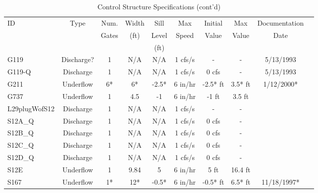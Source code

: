 \scriptsize
\begin{table}[h]
\caption{Control Structure Specifications (cont'd)}
\label{tab:struc-specs2}
\begin{tabular}{@{}lccccccccc@{}}
\toprule
{ID}            & {Type}        & Num.     & Width       & Sill         & Max            & Initial         & Max     & Documentation   \\
                &               & Gates    & (ft)        & Level        & Speed          & Value           & Value   & Date            \\
                &               &          &             & (ft)         &                &                 &         &                 \\
\hline
{G119}          & Discharge?    & 1        & N/A         & N/A          & 1 cfs/s        & -               & -       & 5/13/1993       \\
{G119-Q}        & Discharge     & 1        & N/A         & N/A          & 1 cfs/s        & 0 cfs           & -       & 5/13/1993       \\
{G211}          & Underflow     & 6*       & 6*          & -2.5*        & 6 in/hr        & -2.5* ft        & 3.5* ft & 1/12/2000*      \\
{G737}          & Underflow     & 1        & 4.5         & -1           & 6 in/hr        & -1 ft           & 3.5 ft  &                 \\
{L29plugWofS12} & Discharge     & 1        & N/A         & N/A          & 1 cfs/s        & -               & -       &                 \\
{S12A\_Q}       & Discharge     & 1        & N/A         & N/A          & 1 cfs/s        & 0 cfs           & -       &                 \\
{S12B\_Q}       & Discharge     & 1        & N/A         & N/A          & 1 cfs/s        & 0 cfs           & -       &                 \\
{S12C\_Q}       & Discharge     & 1        & N/A         & N/A          & 1 cfs/s        & 0 cfs           & -       &                 \\
{S12D\_Q}       & Discharge     & 1        & N/A         & N/A          & 1 cfs/s        & 0 cfs           & -       &                 \\
{S12E}          & Underflow     & 1        & 9.84        & 5            & 6 in/hr        & 5 ft            & 16.4 ft &                 \\
{S167}          & Underflow     & 1*       & 12*         & -0.5*        & 6 in/hr        & -0.5* ft        & 6.5* ft & 11/18/1997*     \\

\end{tabular}
\end{table}
